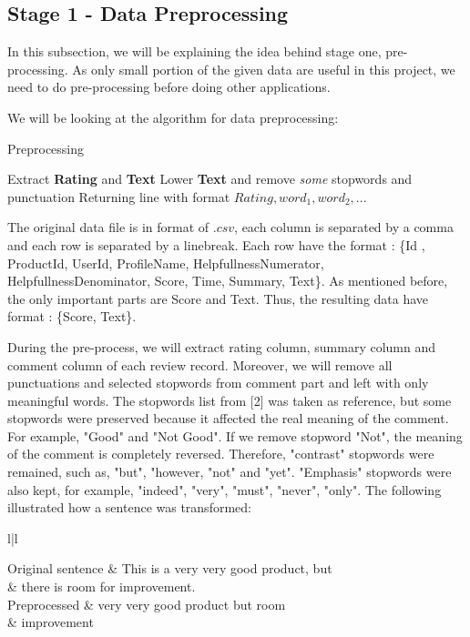 \subsection{Stage 1 - Data Preprocessing}
In this subsection, we will be explaining the idea behind stage one, pre-processing. As only small portion of the given data are useful in this project, we need to do pre-processing before doing other applications.

We will be looking at the algorithm for data preprocessing: 

\begin{algorithm}
\caption{Preprocessing}
\DontPrintSemicolon
{}

 {
 	Extract \textbf{Rating} and \textbf{Text}\;
 	Lower \textbf{Text} and remove \emph{some} stopwords and punctuation\;
 	Returning line with format \(Rating, word_{1}, word_{2}, ...\)\;
 }
\end{algorithm}


The original data file is in format of \(.csv\), each column is separated by a comma and each row is separated by a linebreak. Each row have the format : \{Id , ProductId, UserId, ProfileName, HelpfullnessNumerator, HelpfullnessDenominator, Score, Time, Summary, Text\}. As mentioned before, the only important parts are Score and Text. Thus, the resulting data have format : \{Score, Text\}. 

During the pre-process, we will extract rating column, summary column and comment column of each review record. Moreover, we will remove all punctuations and selected stopwords from comment part and left with only meaningful words. The stopwords list from [2] was taken as reference, but some stopwords were preserved because it affected the real meaning of the comment. For example, "Good" and "Not Good". If we remove stopword "Not", the meaning of the comment is completely reversed. Therefore, "contrast" stopwords were remained, such as, "but", "however, "not" and "yet". "Emphasis" stopwords were also kept, for example, "indeed", "very", "must", "never", "only". The following illustrated how a sentence was transformed:\\

\begin{tabular}{l|l}
	
  \midrule
  	 {Original sentence} &
  	This is a very very good product, but \\
  	& there is room for improvement.\\
  	\hline
	 {Preprocessed} &
	very very good product but room \\
	& improvement \\
  \bottomrule
\end{tabular}\\


